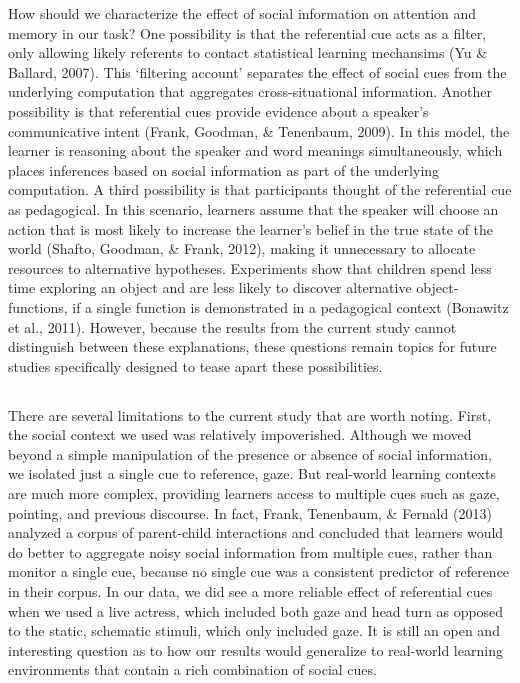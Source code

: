 \documentclass[authoryear, review]{elsarticle}
\providecommand{\DIFaddtex}[1]{{\protect\color{blue}\uwave{#1}}} %
\providecommand{\DIFaddbegin}{} %
\providecommand{\DIFaddend}{} %
\providecommand{\DIFadd}[1]{\texorpdfstring{\DIFaddtex{#1}}{#1}} %
\begin{document}
How should we characterize the effect of social information on attention
and memory in our task? One possibility is that the referential cue acts
as a filter, only allowing likely referents to contact statistical
learning mechansims (Yu \& Ballard, 2007). This `filtering account'
separates the effect of social cues from the underlying computation that
aggregates cross-situational information. Another possibility is that
referential cues provide evidence about a speaker's communicative intent
(Frank, Goodman, \& Tenenbaum, 2009). In this model, the learner is
reasoning about the speaker and word meanings simultaneously, which
places inferences based on social information as part of the underlying
computation. A third possibility is that participants thought of the
referential cue as pedagogical. In this scenario, learners assume that
the speaker will choose an action that is most likely to increase the
learner's belief in the true state of the world (Shafto, Goodman, \&
Frank, 2012), making it unnecessary to allocate resources to alternative
hypotheses. Experiments show that children spend less time exploring an
object and are less likely to discover alternative object-functions, if
a single function is demonstrated in a pedagogical context (Bonawitz et
al., 2011). However, because the results from the current study cannot
distinguish between these explanations, these questions remain topics
for future studies specifically designed to tease apart these
possibilities.

\DIFaddbegin \subsection{\DIFadd{Limitations}}\label{limitations}

\DIFaddend There are several limitations to the current study that are worth
noting. First, the social context we used was relatively impoverished.
Although we moved beyond a simple manipulation of the presence or
absence of social information, we isolated just a single cue to
reference, gaze. But real-world learning contexts are much more complex,
providing learners access to multiple cues such as gaze, pointing, and
previous discourse. In fact, Frank, Tenenbaum, \& Fernald (2013)
analyzed a corpus of parent-child interactions and concluded that
learners would do better to aggregate noisy social information from
multiple cues, rather than monitor a single cue, because no single cue
was a consistent predictor of reference in their corpus. In our data, we
did see a more reliable effect of referential cues when we used a live
actress, which included both gaze and head turn as opposed to the
static, schematic stimuli, which only included gaze. It is still an open
and interesting question as to how our results would generalize to
real-world learning environments that contain a rich combination of
social cues.
\end{document}
